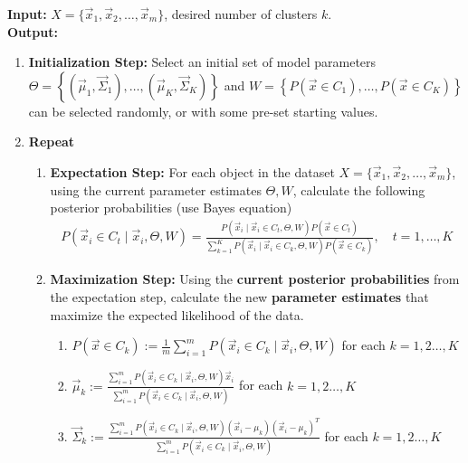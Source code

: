 \documentclass[11pt]{elegantbook}
\begin{document}
\begin{definition}\normalfont
\textbf{Input:} $X=\{\vec{x}_1, \vec{x}_2, \ldots, \vec{x}_m\}$, desired number of clusters $k$.\\
\textbf{Output:} 
\begin{enumerate}[$\bullet$]
    \item \textbf{Initialization Step:} Select an initial set of model parameters\\
    $\Theta=\left\{\left(\vec{\mu}_1, \vec{\Sigma}_1\right), \ldots,\left(\vec{\mu}_K, \vec{\Sigma}_K\right)\right\}$ and $W=\left\{P\left(\vec{x} \in C_1\right), \ldots, P\left(\vec{x} \in C_K\right)\right\}$ can be selected randomly, or with some pre-set starting values.
    \item \textbf{Repeat}
    \begin{enumerate}
        \item \textbf{Expectation Step:} For each object in the dataset $X=\{\vec{x}_1, \vec{x}_2, \ldots, \vec{x}_m\}$, using the current parameter estimates $\Theta, W$, calculate the following posterior probabilities (use Bayes equation)
        \begin{equation}
            \begin{aligned}
                P\left(\vec{x}_i \in C_t \mid \vec{x}_i, \Theta, W\right)=\frac{P\left(\vec{x}_i \mid \vec{x}_i \in C_t, \Theta, W\right) P\left(\vec{x} \in C_t\right)}{\sum_{k=1}^K P\left(\vec{x}_i \mid \vec{x}_i \in C_k, \Theta, W\right) P\left(\vec{x} \in C_k\right)},\quad t=1,\dots,K
            \end{aligned}
            \nonumber
        \end{equation}
        \item \textbf{Maximization Step:} Using the \textbf{current posterior probabilities} from the expectation step, calculate the new \textbf{parameter estimates} that maximize the expected likelihood of the data.
        \begin{enumerate}[$\circ$]
            \item $P\left(\vec{x} \in C_k\right):=\frac{1}{m} \sum_{i=1}^m P\left(\vec{x}_i \in C_{k} \mid \vec{x}_i, \Theta, W\right)$ for each $k=1,2 \ldots, K$
            \item $\vec{\mu}_k:=\frac{\sum_{i=1}^m P\left(\vec{x}_i \in C_k \mid \vec{x}_i, \Theta, W\right) \vec{x}_i}{\sum_{i=1}^m P\left(\vec{x}_i \in C_k \mid \vec{x}_i, \Theta, W\right)}$ for each $k=1,2 \ldots, K$
            \item $\vec{\Sigma}_k:=\frac{\sum_{i=1}^m P\left(\vec{x}_i \in C_k \mid \vec{x}_i, \Theta, W\right)\left(\vec{x}_i-\mu_k\right)\left(\vec{x}_i-\mu_k\right)^T}{\sum_{i=1}^m P\left(\vec{x}_i \in C_k \mid \vec{x}_i, \Theta, W\right)}$ for each $k=1,2 \ldots, K$
        \end{enumerate}
    \end{enumerate}
\end{enumerate}
\end{definition}
\end{document}
